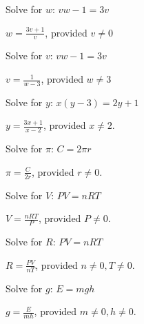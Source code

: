 \documentclass{ximera}
\begin{document}
\begin{question}
\begin{problem}
Solve for $w$:  $vw - 1 = 3v$

\begin{solution}
$w = \frac{3v+1}{v}$, provided $v \neq 0$
\end{solution}
\end{problem}

\begin{problem}
Solve for $v$:   $vw - 1 = 3v$

\begin{solution}
 $v = \frac{1}{w-3}$, provided $w \neq 3$
\end{solution}
\end{problem}

\begin{problem}
Solve for $y$:  $x(y-3) = 2y+1$

\begin{solution}
$y = \frac{3x+1}{x-2}$, provided $x \neq 2$.
\end{solution}
\end{problem}

\begin{problem}
Solve for $\pi$:  $C = 2\pi r$

\begin{solution}
$\pi = \frac{C}{2r}$, provided $r \neq 0$.
\end{solution}
\end{problem}

\begin{problem}
Solve for $V$:   $PV = nRT$

\begin{solution}
$V = \frac{nRT}{P}$, provided $P \neq 0$.
\end{solution}
\end{problem}

\begin{problem}
Solve for $R$:  $PV = nRT$

\begin{solution}
$R = \frac{PV}{nT}$, provided $n \neq 0, T \neq 0$.
\end{solution}
\end{problem}

\begin{problem}
Solve for $g$:   $E = mgh$ 

\begin{solution}
$g = \frac{E}{mh}$, provided $m \neq 0, h \neq 0$.
\end{solution}
\end{problem}


\end{question}
\end{document}
